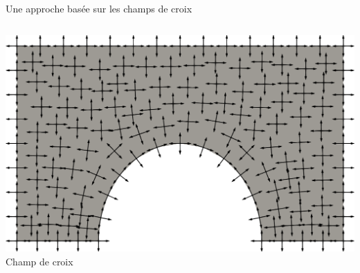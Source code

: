 \documentclass[compress,10pt,aspectratio=169]{beamer}
\begin{document}
\begin{frame}{Une approche basée sur les champs de croix}
\begin{columns}


\begin{column}{0.25\textwidth}
\centering
\includegraphics[scale=0.068]{images/frey_4.pdf}\hspace{0.2cm}
\footnotesize Champ de croix
\end{column}


\end{columns}
\end{frame}
\end{document}
